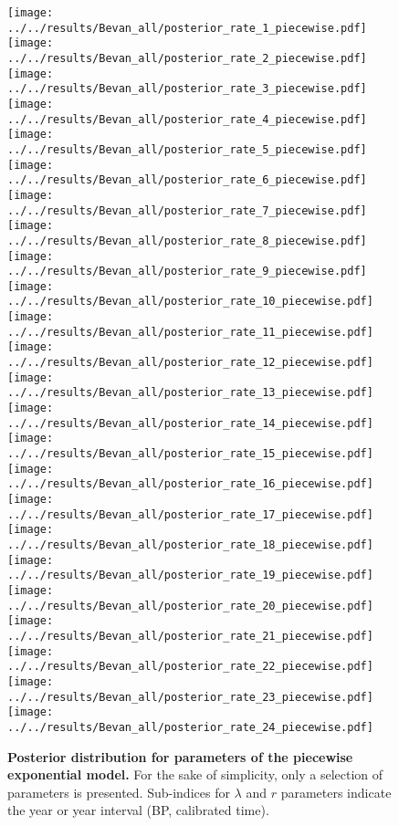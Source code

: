 \documentclass[a4paper]{article}
\begin{document}
\begin{figure}[h]
\begin{center}
\texttt{[image: ../../results/Bevan\_all/posterior\_rate\_1\_piecewise.pdf]}\texttt{[image: ../../results/Bevan\_all/posterior\_rate\_2\_piecewise.pdf]}\texttt{[image: ../../results/Bevan\_all/posterior\_rate\_3\_piecewise.pdf]}\texttt{[image: ../../results/Bevan\_all/posterior\_rate\_4\_piecewise.pdf]}\texttt{[image: ../../results/Bevan\_all/posterior\_rate\_5\_piecewise.pdf]}
\texttt{[image: ../../results/Bevan\_all/posterior\_rate\_6\_piecewise.pdf]}\texttt{[image: ../../results/Bevan\_all/posterior\_rate\_7\_piecewise.pdf]}\texttt{[image: ../../results/Bevan\_all/posterior\_rate\_8\_piecewise.pdf]}\texttt{[image: ../../results/Bevan\_all/posterior\_rate\_9\_piecewise.pdf]}\texttt{[image: ../../results/Bevan\_all/posterior\_rate\_10\_piecewise.pdf]}
\texttt{[image: ../../results/Bevan\_all/posterior\_rate\_11\_piecewise.pdf]}\texttt{[image: ../../results/Bevan\_all/posterior\_rate\_12\_piecewise.pdf]}\texttt{[image: ../../results/Bevan\_all/posterior\_rate\_13\_piecewise.pdf]}\texttt{[image: ../../results/Bevan\_all/posterior\_rate\_14\_piecewise.pdf]}\texttt{[image: ../../results/Bevan\_all/posterior\_rate\_15\_piecewise.pdf]}
\texttt{[image: ../../results/Bevan\_all/posterior\_rate\_16\_piecewise.pdf]}\texttt{[image: ../../results/Bevan\_all/posterior\_rate\_17\_piecewise.pdf]}\texttt{[image: ../../results/Bevan\_all/posterior\_rate\_18\_piecewise.pdf]}\texttt{[image: ../../results/Bevan\_all/posterior\_rate\_19\_piecewise.pdf]}\texttt{[image: ../../results/Bevan\_all/posterior\_rate\_20\_piecewise.pdf]}
\texttt{[image: ../../results/Bevan\_all/posterior\_rate\_21\_piecewise.pdf]}\texttt{[image: ../../results/Bevan\_all/posterior\_rate\_22\_piecewise.pdf]}\texttt{[image: ../../results/Bevan\_all/posterior\_rate\_23\_piecewise.pdf]}\texttt{[image: ../../results/Bevan\_all/posterior\_rate\_24\_piecewise.pdf]}
\end{center}
\caption{\textbf{Posterior distribution for parameters of the piecewise exponential model.} For the sake of simplicity, only a selection of parameters is presented. Sub-indices for $\lambda$ and $r$ parameters indicate the year or year interval (BP, calibrated time).}
\label{fig:posterior_piecewise_rate}
\end{figure}
\end{document}
